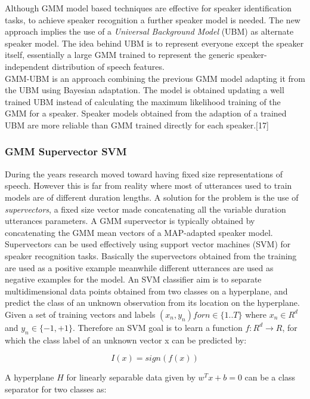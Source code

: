 Although GMM model based techniques are effective for speaker
identification tasks, to achieve speaker recognition a further
speaker model is needed. The new approach implies the use of
a \textit{Universal Background Model} (UBM) as alternate speaker model.
The idea behind UBM is to represent everyone except the speaker itself, essentially
a large GMM trained to represent the generic speaker-independent distribution
of speech features.\\
GMM-UBM is an approach combining the previous GMM model adapting it from
the UBM using Bayesian adaptation. The model is obtained updating a well
trained UBM instead of calculating the maximum likelihood training of the GMM
for a speaker. Speaker models obtained from the adaption of a trained UBM
are more reliable than GMM trained directly for each speaker.[17]

\subsubsection{GMM Supervector SVM}

During the years research moved toward having fixed size representations
of speech. However this is far from reality where most of utterances used to train
models are of different duration lengths. A solution for the problem is the use of
\textit{supervectors}, a fixed size vector made concatenating all the variable duration
utterances parameters. A GMM supervector is typically obtained by concatenating
the GMM mean vectors of a MAP-adapted speaker model.\\
Supervectors can be used effectively using support vector machines (SVM) for speaker
recognition tasks. Basically the supervectors obtained from the training are used
as a positive example meanwhile different utterances are used as negative examples for
the model. An SVM classifier aim is to separate multidimensional data points obtained from two classes
on a hyperplane, and predict the class of an unknown observation from its location
on the hyperplane.
Given a set of training vectors and labels $(x_{n},y_{n}) for n \in \{1..T\}$ where
$x_{n} \in R^d$ and $y_{n} \in \{-1,+1\}$. Therefore an SVM goal is to learn
a function $f:R^d \rightarrow R$, for which the class label of an unknown vector x
can be predicted by:

\begin{equation}
    I(x)= sign(f(x))
\end{equation}

A hyperplane $H$ for linearly separable data given by $w^Tx+b = 0$ can be a class separator for
two classes as:

